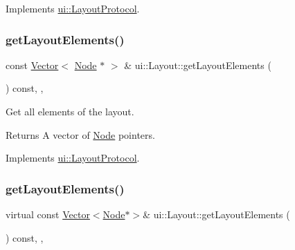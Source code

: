 Implements \hyperlink{classui_1_1LayoutProtocol_afacf70c8ceec076a9c1237427cbd614a}{ui\+::\+Layout\+Protocol}.

\mbox{\label{classui_1_1Layout_a832b7950870e62e045456b7565db924d}} 
\subsubsection{\texorpdfstring{get\+Layout\+Elements()}{getLayoutElements()}\hspace{0.1cm}{\footnotesize\ttfamily [1/2]}}
{\footnotesize\ttfamily const \hyperlink{classVector}{Vector}$<$ \hyperlink{classNode}{Node} $\ast$ $>$ \& ui\+::\+Layout\+::get\+Layout\+Elements (\begin{DoxyParamCaption}{ }\end{DoxyParamCaption}) const\hspace{0.3cm}{\ttfamily [override]}, {\ttfamily [protected]}, {\ttfamily [virtual]}}



Get all elements of the layout. 

\begin{DoxyReturn}{Returns}
A vector of \hyperlink{classNode}{Node} pointers. 
\end{DoxyReturn}


Implements \hyperlink{classui_1_1LayoutProtocol_acd689e1718c903c7e9ed3277eb83b97c}{ui\+::\+Layout\+Protocol}.

\mbox{\label{classui_1_1Layout_ab80ee89eff7fa311e237e63d72bb18c7}} 
\subsubsection{\texorpdfstring{get\+Layout\+Elements()}{getLayoutElements()}\hspace{0.1cm}{\footnotesize\ttfamily [2/2]}}
{\footnotesize\ttfamily virtual const \hyperlink{classVector}{Vector}$<$\hyperlink{classNode}{Node}$\ast$$>$\& ui\+::\+Layout\+::get\+Layout\+Elements (\begin{DoxyParamCaption}{ }\end{DoxyParamCaption}) const\hspace{0.3cm}{\ttfamily [override]}, {\ttfamily [protected]}, {\ttfamily [virtual]}}



